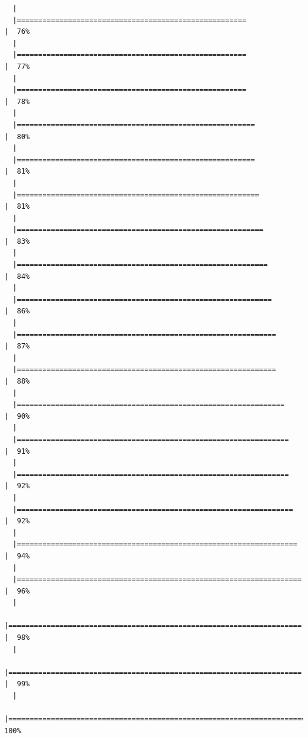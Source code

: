 \documentclass[
  letterpaper,
  DIV=11,
  numbers=noendperiod]{scrreprt}
\begin{document}
\begin{verbatim}
  |                                                                            
  |======================================================                |  76%
  |                                                                            
  |======================================================                |  77%
  |                                                                            
  |======================================================                |  78%
  |                                                                            
  |========================================================              |  80%
  |                                                                            
  |========================================================              |  81%
  |                                                                            
  |=========================================================             |  81%
  |                                                                            
  |==========================================================            |  83%
  |                                                                            
  |===========================================================           |  84%
  |                                                                            
  |============================================================          |  86%
  |                                                                            
  |=============================================================         |  87%
  |                                                                            
  |=============================================================         |  88%
  |                                                                            
  |===============================================================       |  90%
  |                                                                            
  |================================================================      |  91%
  |                                                                            
  |================================================================      |  92%
  |                                                                            
  |=================================================================     |  92%
  |                                                                            
  |==================================================================    |  94%
  |                                                                            
  |===================================================================   |  96%
  |                                                                            
  |===================================================================== |  98%
  |                                                                            
  |===================================================================== |  99%
  |                                                                            
  |======================================================================| 100%
\end{verbatim}
\end{document}
